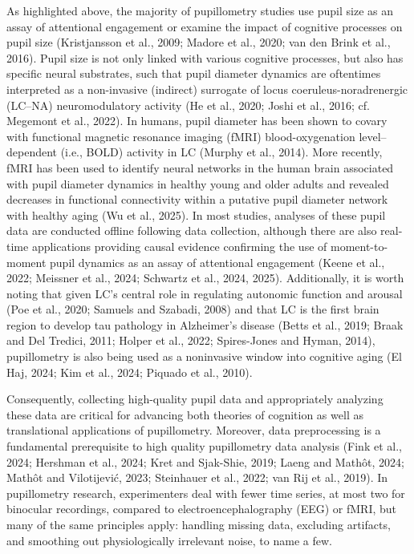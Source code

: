 As highlighted above, the majority of pupillometry studies use pupil size as an assay of attentional engagement or examine the impact of cognitive processes on pupil size (Kristjansson et al., 2009; Madore et al., 2020; van den Brink et al., 2016). Pupil size is not only linked with various cognitive processes, but also has specific neural substrates, such that pupil diameter dynamics are oftentimes interpreted as a non-invasive (indirect) surrogate of locus coeruleus-noradrenergic (LC–NA) neuromodulatory activity (He et al., 2020; Joshi et al., 2016; cf. Megemont et al., 2022). In humans, pupil diameter has been shown to covary with functional magnetic resonance imaging (fMRI) blood-oxygenation level–dependent (i.e., BOLD) activity in LC (Murphy et al., 2014). More recently, fMRI has been used to identify neural networks in the human brain associated with pupil diameter dynamics in healthy young and older adults and revealed decreases in functional connectivity within a putative pupil diameter network with healthy aging (Wu et al., 2025). In most studies, analyses of these pupil data are conducted offline following data collection, although there are also real-time applications providing causal evidence confirming the use of moment-to-moment pupil dynamics as an assay of attentional engagement (Keene et al., 2022; Meissner et al., 2024; Schwartz et al., 2024, 2025). Additionally, it is worth noting that given LC’s central role in regulating autonomic function and arousal (Poe et al., 2020; Samuels and Szabadi, 2008) and that LC is the first brain region to develop tau pathology in Alzheimer’s disease (Betts et al., 2019; Braak and Del Tredici, 2011; Holper et al., 2022; Spires-Jones and Hyman, 2014), pupillometry is also being used as a noninvasive window into cognitive aging (El Haj, 2024; Kim et al., 2024; Piquado et al., 2010).

Consequently, collecting high-quality pupil data and appropriately analyzing these data are critical for advancing both theories of cognition as well as translational applications of pupillometry. Moreover, data preprocessing is a fundamental prerequisite to high quality pupillometry data analysis (Fink et al., 2024; Hershman et al., 2024; Kret and Sjak-Shie, 2019; Laeng and Mathôt, 2024; Mathôt and Vilotijević, 2023; Steinhauer et al., 2022; van Rij et al., 2019). In pupillometry research, experimenters deal with fewer time series, at most two for binocular recordings, compared to electroencephalography (EEG) or fMRI, but many of the same principles apply: handling missing data, excluding artifacts, and smoothing out physiologically irrelevant noise, to name a few.

